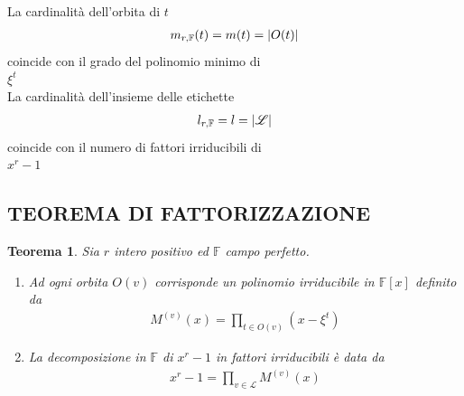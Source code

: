 \documentclass[mathserif]{beamer}
\newtheorem{teorema}{Teorema}
\begin{document}
\begin{frame}
   \begin{center}
      La cardinalità dell'orbita di $t$
        \begin{align*}
	  m_{r,\mathbb{F}}(t) = m(t) = \arrowvert O(t) \arrowvert
	\end{align*}
      coincide con il grado del polinomio minimo di \\
     $\xi^{t}$
     \vspace{0.5cm}
     \\
      La cardinalità dell'insieme delle etichette
 	\begin{align*}
	   l_{r,\mathbb{F}} = l = \arrowvert \mathscr{L} \arrowvert
	\end{align*}
     coincide con il numero di fattori irriducibili di \\ 
     $x^r-1$	
    \end{center}
\end{frame}

\subsection{TEOREMA DI FATTORIZZAZIONE}
\begin{frame}
    \begin{teorema}
      Sia $r$ intero positivo ed $\mathbb{F}$ campo perfetto. 
      \begin{enumerate}
	  \item Ad ogni orbita $O(v)$ corrisponde un polinomio irriducibile in $\mathbb{F}[x]$ definito da 
		\begin{align*}
		  M^{(v)}(x) =  \prod_{t \in O(v)} (x- \xi^t)
		\end{align*}
	  \item La decomposizione in $\mathbb{F}$ di $x^r - 1$ in fattori irriducibili è data da 
		\begin{align*}
		  x^r - 1 = \prod_{v \in \mathscr{L} } M^{(v)}(x)
		\end{align*}
      \end{enumerate}
    \end{teorema}
\end{frame}


\end{document}
